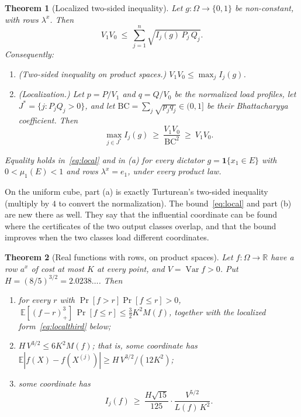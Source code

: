 \documentclass[11pt]{article}
\numberwithin{equation}{section}
\newtheorem{theorem}{Theorem}[section]
\theoremstyle{definition}
\theoremstyle{remark}
\newcommand{\E}{\mathbb{E}}
\newcommand{\R}{\mathbb{R}}
\newcommand{\1}{\mathbf 1}
\newcommand{\Var}{\operatorname{Var}}
\begin{document}
\begin{theorem}[Localized two-sided inequality]\label{thm:local}
Let $g:\Omega\to\{0,1\}$ be non-constant, with rows $\lambda^x$. Then
\begin{equation}\label{eq:local}
V_1V_0\ \le\ \sum_{j=1}^n\sqrt{I_j(g)\,P_j\,Q_j}.
\end{equation}
Consequently:
\begin{enumerate}[label=(\alph*),itemsep=1pt]
\item \emph{(Two-sided inequality on product spaces.)} $V_1V_0\le\max_jI_j(g)$.
\item \emph{(Localization.)} Let $p=P/V_1$ and $q=Q/V_0$ be the normalized load profiles, let $J^*=\{j:P_jQ_j>0\}$, and let $\mathrm{BC}=\sum_j\sqrt{p_jq_j}\in(0,1]$ be their Bhattacharyya coefficient. Then
\[
\max_{j\in J^*}I_j(g)\ \ge\ \frac{V_1V_0}{\mathrm{BC}^2}\ \ge\ V_1V_0 .
\]
\end{enumerate}
Equality holds in~\eqref{eq:local} and in (a) for every dictator $g=\1\{x_1\in E\}$ with $0<\mu_1(E)<1$ and rows $\lambda^x=e_1$, under every product law.
\end{theorem}

On the uniform cube, part (a) is exactly Turturean's two-sided inequality \cite[Theorem~1.5]{Tur26} (multiply by $4$ to convert the normalization). The bound~\eqref{eq:local} and part (b) are new there as well. They say that the influential coordinate can be found where the certificates of the two output classes overlap, and that the bound improves when the two classes load different coordinates.

\begin{theorem}[Real functions with rows, on product spaces]\label{thm:real}
Let $f:\Omega\to\R$ have a row $a^x$ of cost at most $K$ at every point, and $V=\Var f>0$. Put $H=(8/5)^{3/2}=2.0238\ldots$. Then
\begin{enumerate}[label=(\alph*),itemsep=1pt]
\item for every $r$ with $\Pr[f>r]\Pr[f\le r]>0$, $\ \E[(f-r)_+^3]\,\Pr[f\le r]\le\frac32K^2M(f)$, together with the localized form~\eqref{eq:localthird} below;
\item $H\,V^{3/2}\le 6K^2M(f)$; that is, some coordinate has $\E|f(X)-f(X^{(j)})|\ge H\,V^{3/2}/(12K^2)$;
\item some coordinate has
\[
I_j(f)\ \ge\ \frac{H\sqrt{15}}{125}\cdot\frac{V^{5/2}}{L(f)\,K^2}.
\]
\end{enumerate}
\end{theorem}
\end{document}
